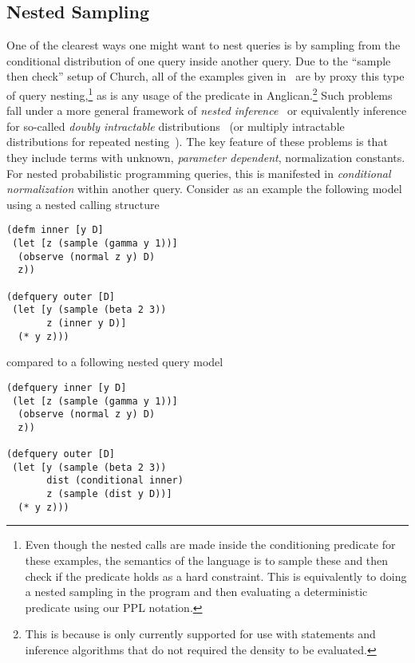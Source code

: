 \subsection{Nested Sampling}
\label{sec:nest:imp:sampling}

One of the clearest ways one might want to nest queries is by sampling from the conditional
distribution of one query inside another query.  Due to the ``sample then check'' setup of
Church, all of the examples given in~\cite{stuhlmuller2014reasoning} are by proxy this
type of query nesting,\footnote{Even though the nested calls are made inside the conditioning
	predicate for these examples, the semantics of the language is to sample these
	and then check if the predicate holds as a hard constraint.  This is equivalently to doing a nested
	sampling in the program and then evaluating a deterministic predicate using our PPL notation.}
as is any usage of the \conditional predicate in Anglican.\footnote{This is because 
	\conditional is only currently supported for use
with \sample statements and inference algorithms that do not required the density to be evaluated.}
Such problems fall under a more general framework of \emph{nested inference}~\cite{mantadelis2011nesting} or equivalently inference for so-called
\emph{doubly intractable} distributions~\citep{murray2006mcmc} (or multiply intractable
	distributions for repeated nesting~\citep{stuhlmuller2014reasoning}).
	 The key feature of these problems is that they include
terms with unknown, \emph{parameter dependent}, normalization constants.  For nested probabilistic programming
queries, this is manifested in \emph{conditional normalization} within another query.
Consider as an example the following model using a nested calling structure
\vspace{-15pt}
\begin{lstlisting}[basicstyle=\ttfamily\footnotesize,multicols=2,frame=none]
(defm inner [y D]
 (let [z (sample (gamma y 1))]
  (observe (normal z y) D)
  z))

(defquery outer [D]
 (let [y (sample (beta 2 3))
       z (inner y D)]
  (* y z)))
\end{lstlisting}
\vspace{-25pt}
compared to a following nested query model
\vspace{-15pt}
\begin{lstlisting}[basicstyle=\ttfamily\footnotesize,multicols=2,frame=none]
(defquery inner [y D]
 (let [z (sample (gamma y 1))]
  (observe (normal z y) D)
  z))
  
(defquery outer [D]
 (let [y (sample (beta 2 3))
       dist (conditional inner)
       z (sample (dist y D))]
  (* y z)))
\end{lstlisting}
